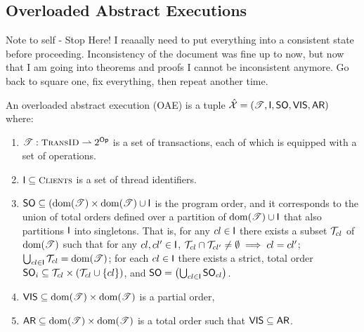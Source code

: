 \subsection{Overloaded Abstract Executions}

\ac{Note to self - Stop Here! I reaaally need to put everything into a consistent state before proceeding. 
Inconsistency of the document was fine up to now, but now that I am going into theorems 
and proofs I cannot be inconsistent anymore. Go back to square one, fix everything, then repeat 
another time.} 


\begin{definition}
An overloaded abstract execution (OAE) is a tuple $\hat{\mathcal{X}} = (\mathscr{T}, \mathsf{I}, {\sf{SO}}, {\mathsf{VIS}}, {\sf{AR}})$ where: 
\begin{enumerate}
\item $\mathscr{T} : \TransID \rightharpoonup 2^{\Op}$ is a set of transactions, each of which is equipped with a set of 
operations.
\item $\I \subseteq \tidset$ is a set of thread identifiers.
\item ${\sf{SO}} \subseteq (\operatorname{dom}(\mathscr{T}) \times \operatorname{dom}(\mathscr{T}) \cup \mathsf{I}$ is the program order, and it corresponds 
to the union of total orders defined over a partition of $\operatorname{dom}(\mathscr{T}) \cup \mathsf{I}$ that also partitions 
$\mathsf{I}$ into singletons. That is, for any $cl \in \mathsf{I}$ there exists a subset $\mathcal{T}_{cl}$ of $\operatorname{dom}(\mathscr{T})$ 
such that for any $cl,cl' \in \mathsf{I}$, $\mathcal{T}_{cl} \cap \mathcal{T}_{cl'} \neq \emptyset \implies cl = cl'$; 
$\bigcup_{cl \in \mathsf{I}} \mathcal{T}_{cl} = \operatorname{dom}(\mathscr{T})$; 
for each $cl \in \mathsf{I}$ there exists a strict, total order ${\sf{SO}}_{i} \subseteq \mathcal{T}_{cl} \times (\mathcal{T}_{cl} \cup \{cl\})$, 
and ${\sf{SO}} = \left( \bigcup_{cl \in \mathsf{I}} {\sf{SO}}_{cl} \right)$.
\item ${\mathsf{VIS}} \subseteq \operatorname{dom}(\mathscr{T}) \times \operatorname{dom}(\mathscr{T})$ is a partial order, 
\item ${\sf{AR}} \subseteq \operatorname{dom}(\mathscr{T}) \times \operatorname{dom}(\mathscr{T})$ is a total order such that ${\mathsf{VIS}} \subseteq {\sf{AR}}$.
\end{enumerate}
\end{definition}

